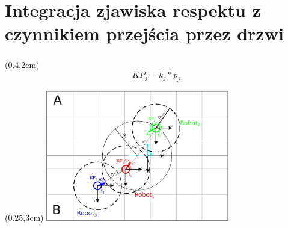 \documentclass{beamer}
\begin{document}
\section*{Integracja zjawiska respektu z czynnikiem przejścia przez drzwi}
\begin{frame}
\frametitle{\secname}

\begin{textblock*}{5cm}(0.4\linewidth,2cm) %
	\begin{equation*}
	KP_j = k_j * p_j
	\end{equation*}
\end{textblock*}

\begin{textblock*}{6cm}(0.25\linewidth,3cm) %
	\includegraphics[page=1,width=8cm]{img/AlgorytmPrzejsciaPrzezDrzwi.pdf}
\end{textblock*}


\end{frame}
\end{document}
